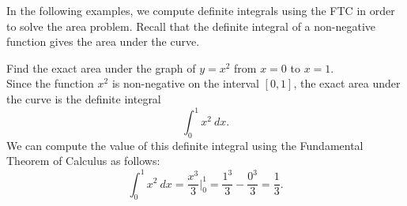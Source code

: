 \documentclass[handout]{ximera}
\begin{document}
In the following examples, we compute definite integrals using the FTC in order to solve the area problem.
Recall that the definite integral of a non-negative function gives the area under the curve.

\begin{example}[example 1]
Find the exact area under the graph of $y = x^2$ from $x = 0$ to $x = 1$. \\
Since the function $x^2$ is non-negative on the interval $[0, 1]$, the 
exact area under the curve is the definite integral 
\[\int_0^1 x^2 \ dx.\]
We can compute the value of this definite integral using the Fundamental Theorem of Calculus as follows:
\[\int_0^1 x^2 \ dx = \frac{x^3}{3} \Bigg|_0^1 = \frac{1^3}{3} - \frac{0^3}{3} = \frac13.\]




\begin{image}
\end{image}



\end{example}
\end{document}
